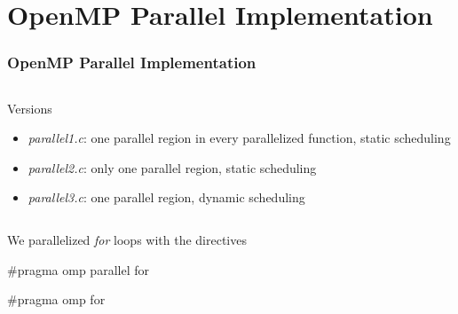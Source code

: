 \documentclass{beamer}
\begin{document}
\section{OpenMP Parallel Implementation}
\begin{frame}[fragile]
	\frametitle{OpenMP Parallel Implementation}
	\begin{columns}
		\begin{block}{Versions}
			\begin{itemize}
				\item \emph{parallel1.c}: one parallel region in every parallelized function, static scheduling
				\item \emph{parallel2.c}: only one parallel region, static scheduling
				\item \emph{parallel3.c}: one parallel region, dynamic scheduling
			\end{itemize}
		\end{block}
	\end{columns}

	\vfill
	We parallelized \emph{for} loops with the directives \begin{semiverbatim}#pragma omp parallel for\end{semiverbatim} \begin{semiverbatim}#pragma omp for\end{semiverbatim}
\end{frame}
\end{document}
